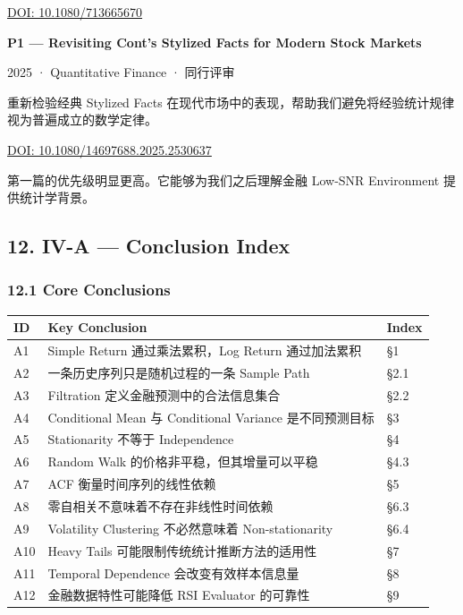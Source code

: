 \href{https://doi.org/10.1080/713665670}{DOI: 10.1080/713665670}

\textbf{P1 --- Revisiting Cont's Stylized Facts for Modern Stock Markets}

2025 · Quantitative Finance · 同行评审

重新检验经典 Stylized Facts 在现代市场中的表现，帮助我们避免将经验统计规律视为普遍成立的数学定律。

\href{https://doi.org/10.1080/14697688.2025.2530637}{DOI: 10.1080/14697688.2025.2530637}

第一篇的优先级明显更高。它能够为我们之后理解金融 Low-SNR Environment 提供统计学背景。

\hypertarget{part-4-52-0680-iv-a-conclusion-index}{%
\subsection{12. IV-A --- Conclusion Index}\label{part-4-52-0680-iv-a-conclusion-index}}

\hypertarget{part-4-52-0680-core-conclusions}{%
\subsubsection{12.1 Core Conclusions}\label{part-4-52-0680-core-conclusions}}

\begin{readertable}
\begin{longtable}[]{@{}
  >{\raggedright\arraybackslash}p{}
  >{\raggedright\arraybackslash}p{}
  >{\raggedright\arraybackslash}p{}@{}}
\toprule
ID & Key Conclusion & Index \\
\midrule
\endhead
A1 & Simple Return 通过乘法累积，Log Return 通过加法累积 & §1 \\
A2 & 一条历史序列只是随机过程的一条 Sample Path & §2.1 \\
A3 & Filtration 定义金融预测中的合法信息集合 & §2.2 \\
A4 & Conditional Mean 与 Conditional Variance 是不同预测目标 & §3 \\
A5 & Stationarity 不等于 Independence & §4 \\
A6 & Random Walk 的价格非平稳，但其增量可以平稳 & §4.3 \\
A7 & ACF 衡量时间序列的线性依赖 & §5 \\
A8 & 零自相关不意味着不存在非线性时间依赖 & §6.3 \\
A9 & Volatility Clustering 不必然意味着 Non-stationarity & §6.4 \\
A10 & Heavy Tails 可能限制传统统计推断方法的适用性 & §7 \\
A11 & Temporal Dependence 会改变有效样本信息量 & §8 \\
A12 & 金融数据特性可能降低 RSI Evaluator 的可靠性 & §9 \\
\bottomrule
\end{longtable}
\end{readertable}


